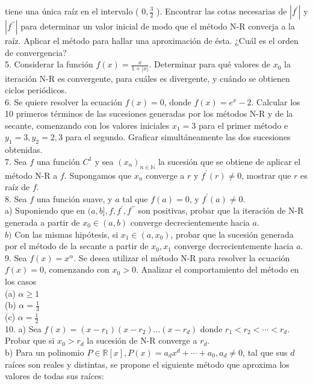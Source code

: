 \documentclass[10pt]{book}
\begin{document}
tiene una única raíz en el intervalo ( $0, \frac{3}{2}$ ). Encontrar las cotas necesarias de $\left|f^{\prime}\right|$ y $\left|f^{\prime \prime}\right|$ para determinar un valor inicial de modo que el método N-R converja a la raíz. Aplicar el método para hallar una aproximación de ésta. ¿Cuál es el orden de convergencia?\\
5. Considerar la función $f(x)=\frac{x}{1+|x|}$. Determinar para qué valores de $x_{0}$ la iteración N-R es convergente, para cuáles es divergente, y cuándo se obtienen ciclos periódicos.\\
6. Se quiere resolver la ecuación $f(x)=0$, donde $f(x)=e^{x}-2$. Calcular los 10 primeros términos de las sucesiones generadas por los métodos N-R y de la secante, comenzando con los valores iniciales $x_{1}=3$ para el primer método e $y_{1}=3, y_{2}=2,3$ para el segundo. Graficar simultáneamente las dos sucesiones obtenidas.\\
7. Sea $f$ una función $C^{1}$ y sea $\left(x_{n}\right)_{n \in \mathbb{N}}$ la sucesión que se obtiene de aplicar el método N-R a $f$. Supongamos que $x_{n}$ converge a $r$ y $f^{\prime}(r) \neq 0$, mostrar que $r$ es raíz de $f$.\\
8. Sea $f$ una función suave, y $a$ tal que $f(a)=0$, y $f^{\prime}(a) \neq 0$.\\
a) Suponiendo que en $(a, b], f, f^{\prime}, f^{\prime \prime}$ son positivas, probar que la iteración de N-R generada a partir de $x_{0} \in(a, b)$ converge decrecientemente hacia $a$.\\
$b)$ Con las mismas hipótesis, si $x_{1} \in\left(a, x_{0}\right)$, probar que la sucesión generada por el método de la secante a partir de $x_{0}, x_{1}$ converge decrecientemente hacia $a$.\\
9. Sea $f(x)=x^{\alpha}$. Se desea utilizar el método N-R para resolver la ecuación $f(x)=0$, comenzando con $x_{0}>0$. Analizar el comportamiento del método en los casos\\
(a) $\alpha \geq 1$\\
(b) $\alpha=\frac{1}{3}$\\
(c) $\alpha=\frac{1}{2}$\\
10. a) Sea $f(x)=\left(x-r_{1}\right)\left(x-r_{2}\right) \ldots\left(x-r_{d}\right)$ donde $r_{1}<r_{2}<\cdots<r_{d}$. Probar que si $x_{0}>r_{d}$ la sucesión de N-R converge a $r_{d}$.\\
b) Para un polinomio $P \in \mathbb{R}[x], P(x)=a_{d} x^{d}+\cdots+a_{0}, a_{d} \neq 0$, tal que sus $d$ raíces son reales y distintas, se propone el siguiente método que aproxima los valores de todas sus raíces:
\end{document}

